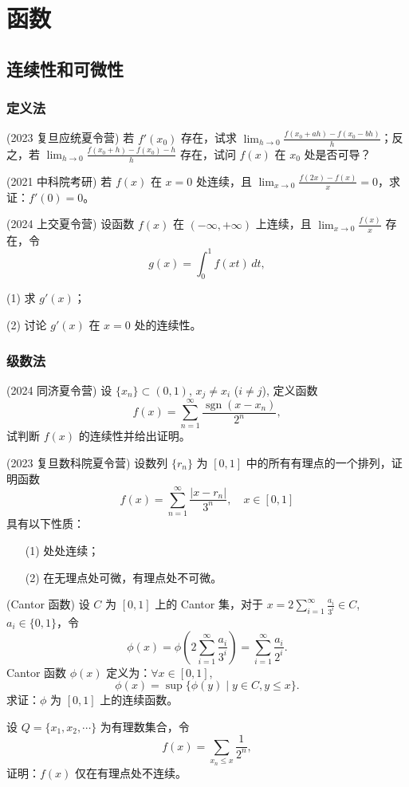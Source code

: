\documentclass[lang=cn,10pt,thmcnt=section]{elegantbook}
\begin{document}
\chapter{函数}
\section{连续性和可微性}
\subsection{定义法}
\begin{example}
	(2023 复旦应统夏令营) 若 \( f'(x_0) \) 存在，试求 \(\lim_{h \to 0} \frac{f(x_0 + ah) - f(x_0 - bh)}{h}\)；反之，若 \(\lim_{h \to 0} \frac{f(x_0 + h) - f(x_0) - h}{h}\) 存在，试问 \( f(x) \) 在 \( x_0 \) 处是否可导？
\end{example}
\begin{example}
	(2021 中科院考研) 若 \( f(x) \) 在 \( x = 0 \) 处连续，且 \(\lim_{x \to 0} \frac{f(2x) - f(x)}{x} = 0\)，求证：\( f'(0) = 0 \)。
\end{example}
\begin{example}
	(2024 上交夏令营) 设函数 \( f(x) \) 在 \((-\infty, +\infty)\) 上连续，且 \(\lim_{x \to 0} \frac{f(x)}{x}\) 存在，令  
\[g(x) = \int_0^1 f(xt) \, dt,\]

(1) 求 \( g'(x) \)；  

(2) 讨论 \( g'(x) \) 在 \( x=0 \) 处的连续性。
\end{example}
\subsection{级数法}
\begin{example}
	(2024 同济夏令营) 设 \(\{x_n\} \subset (0,1)\), \(x_j \neq x_i\) (\(i \neq j\)), 定义函数
\[ f(x) = \sum_{n=1}^{\infty} \frac{\operatorname{sgn}(x - x_n)}{2^n}, \]
试判断 \(f(x)\) 的连续性并给出证明。

\end{example}
\begin{example}
	(2023 复旦数科院夏令营) 设数列 \(\{r_n\}\) 为 \([0,1]\) 中的所有有理点的一个排列，证明函数
\[ f(x) = \sum_{n=1}^{\infty} \frac{|x - r_n|}{3^n}, \quad x \in [0,1] \]
具有以下性质：
\begin{enumerate}
    \item[(1)] 处处连续；
    \item[(2)] 在无理点处可微，有理点处不可微。
\end{enumerate}
\end{example}
\begin{example}
	(Cantor 函数) 设 \( C \) 为 \([0,1]\) 上的 Cantor 集，对于 \( x = 2 \sum_{i=1}^{\infty} \frac{a_i}{3^i} \in C \), \( a_i \in \{0,1\} \)，令  
\[ \phi(x) = \phi\left(2 \sum_{i=1}^{\infty} \frac{a_i}{3^i}\right) = \sum_{i=1}^{\infty} \frac{a_i}{2^i}. \]  
Cantor 函数 \(\phi(x)\) 定义为：\(\forall x \in [0,1]\),  
\[ \phi(x) = \sup\{\phi(y) \mid y \in C, y \leq x\}. \]  
求证：\(\phi\) 为 \([0,1]\) 上的连续函数。
\end{example}
\begin{example}
	设 \( Q = \{x_1, x_2, \cdots\} \) 为有理数集合，令  
	\[ f(x) = \sum_{x_n \leq x} \frac{1}{2^n}, \]  
	证明：\( f(x) \) 仅在有理点处不连续。
\end{example}
\end{document}
